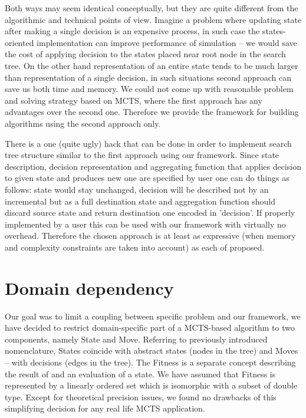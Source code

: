 Both ways may seem identical conceptually, but they are quite different from
the algorithmic and technical points of view.
Imagine a problem where updating state after making a single decision is an
expensive process, in such case the states-oriented implementation can improve
performance of simulation -- we would save the cost of applying decision to the
states placed near root node in the search tree.
On the other hand representation of an entire state tends to be much
larger than representation of a single decision, in such situations second
approach can save us both time and memory.
We could not come up with reasonable problem and solving strategy based on
MCTS, where the first approach has any advantages over the second one. Therefore we
provide the framework for building algorithms using the second approach only.

There is a one (quite ugly) hack that can be done in order to implement search
tree structure similar to the first approach using our framework. Since state
description, decision representation and aggregating function that applies
decision to given state and produces new one are specified by user one can do
things as follows: state would stay unchanged, decision will be described not
by an incremental but as a full destination state and aggregation function
should discard source state and return destination one encoded in 'decision'.
If properly implemented by a user this can be used with our framework with
virtually no overhead. Therefore the chosen approach is at least as expressive
(when memory and complexity constraints are taken into account) as each of
proposed.

\section{Domain dependency}
Our goal was to limit a coupling between specific problem and our framework, we
have decided to restrict domain-specific part of a MCTS-based algorithm to two
components, namely State and Move. Referring to previously introduced
nomenclature, States coincide with abstract states (nodes in the tree) and
Moves -- with decisions (edges in the tree).
The Fitness is a separate concept describing the result of and an evaluation of a
state. We have assumed that Fitness is represented by a linearly ordered set
which is isomorphic with a subset of double type. Except for theoretical
precision issues, we found no drawbacks of this simplifying decision for any
real life MCTS application.

